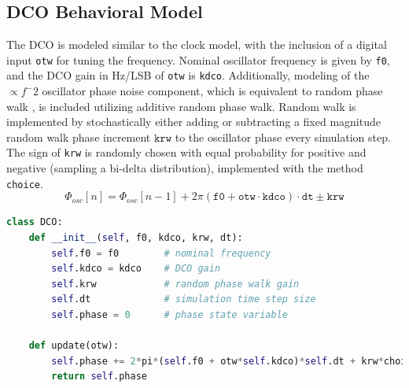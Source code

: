 \subsection{DCO Behavioral Model}
The DCO is modeled similar to the clock model, with the inclusion of a digital input \texttt{otw} for tuning the frequency. Nominal oscillator frequency is given by \texttt{f0}, and the DCO gain in Hz/LSB of \texttt{otw} is \texttt{kdco}. Additionally, modeling of the $\propto f^-2$ oscillator phase noise component, which is equivalent to random phase walk \cite{vannicola_varshney_1983}, is included utilizing additive random phase walk. Random walk is implemented by stochastically either adding or subtracting a fixed magnitude random walk phase increment $\texttt{krw}$ to the oscillator phase every simulation step. The sign of \texttt{krw} is randomly chosen with equal probability for positive and negative (sampling a bi-delta distribution), implemented with the method \texttt{choice}.
\begin{equation}\label{eq:dco_behavioral_model}
	\Phi_{osc}[n] = \Phi_{osc}[n-1] + 2\pi(\mathtt{f0}+\mathtt{otw}\cdot\mathtt{kdco})\cdot\mathtt{dt} \pm \mathtt{krw}
\end{equation}
\begin{lstlisting}[language={Python}, caption={DCO behavioral model Python pseudocode.}, label={dco_code}]
class DCO:
	def __init__(self, f0, kdco, krw, dt):
		self.f0 = f0		# nominal frequency
		self.kdco = kdco 	# DCO gain
		self.krw			# random phase walk gain
		self.dt 			# simulation time step size
		self.phase = 0		# phase state variable

	def update(otw):
		self.phase += 2*pi*(self.f0 + otw*self.kdco)*self.dt + krw*choice([-1,1])
		return self.phase
   \end{lstlisting}

